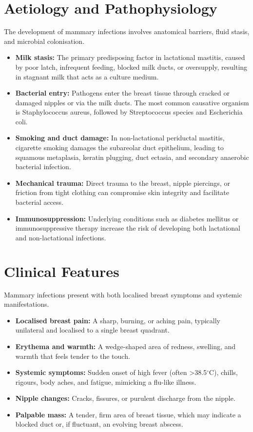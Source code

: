 \section*{Aetiology and Pathophysiology}
The development of mammary infections involves anatomical barriers, fluid stasis, and microbial colonisation.
\begin{itemize}
    \item \textbf{Milk stasis:} The primary predisposing factor in lactational mastitis, caused by poor latch, infrequent feeding, blocked milk ducts, or oversupply, resulting in stagnant milk that acts as a culture medium.
    \item \textbf{Bacterial entry:} Pathogens enter the breast tissue through cracked or damaged nipples or via the milk ducts. The most common causative organism is Staphylococcus aureus, followed by Streptococcus species and Escherichia coli.
    \item \textbf{Smoking and duct damage:} In non-lactational periductal mastitis, cigarette smoking damages the subareolar duct epithelium, leading to squamous metaplasia, keratin plugging, duct ectasia, and secondary anaerobic bacterial infection.
    \item \textbf{Mechanical trauma:} Direct trauma to the breast, nipple piercings, or friction from tight clothing can compromise skin integrity and facilitate bacterial access.
    \item \textbf{Immunosuppression:} Underlying conditions such as diabetes mellitus or immunosuppressive therapy increase the risk of developing both lactational and non-lactational infections.
\end{itemize}

\section*{Clinical Features}
Mammary infections present with both localised breast symptoms and systemic manifestations.
\begin{itemize}
    \item \textbf{Localised breast pain:} A sharp, burning, or aching pain, typically unilateral and localised to a single breast quadrant.
    \item \textbf{Erythema and warmth:} A wedge-shaped area of redness, swelling, and warmth that feels tender to the touch.
    \item \textbf{Systemic symptoms:} Sudden onset of high fever (often >38.5$^\circ$C), chills, rigours, body aches, and fatigue, mimicking a flu-like illness.
    \item \textbf{Nipple changes:} Cracks, fissures, or purulent discharge from the nipple.
    \item \textbf{Palpable mass:} A tender, firm area of breast tissue, which may indicate a blocked duct or, if fluctuant, an evolving breast abscess.
\end{itemize}

